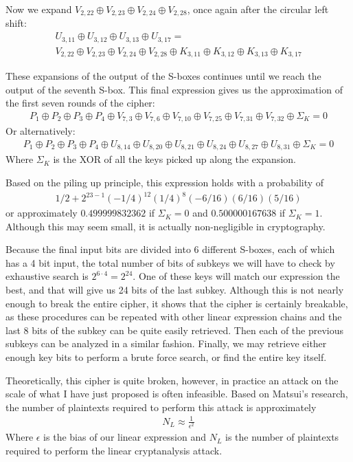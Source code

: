 \documentclass[12pt, a4paper, draft]{report}
\begin{document}
Now we expand $V_{2,22} \oplus V_{2,23} \oplus V_{2,24} \oplus V_{2,28}$, once again
after the circular left shift:
\begin{align*}
    U_{3,11} \oplus U_{3,12} \oplus U_{3,13} \oplus U_{3,17} =\\
    V_{2,22} \oplus V_{2,23} \oplus V_{2,24} \oplus V_{2,28} \oplus K_{3,11}
    \oplus K_{3,12} \oplus K_{3,13} \oplus K_{3,17}
\end{align*}

These expansions of the output of the S-boxes continues until we reach the output of
the seventh S-box. This final expression gives us the approximation of the first seven
rounds of the cipher:
\begin{align*}
    P_1 \oplus P_2 \oplus P_3 \oplus P_4 \oplus V_{7,3} \oplus V_{7,6} \oplus V_{7,10}
    \oplus V_{7,25} \oplus V_{7,31} \oplus V_{7,32} \oplus \Sigma_K= 0
\end{align*}
Or alternatively:
\begin{align*}
    P_1 \oplus P_2 \oplus P_3 \oplus P_4 \oplus U_{8,14} \oplus U_{8,20} \oplus
    U_{8,21} \oplus U_{8,24} \oplus U_{8,27} \oplus U_{8,31} \oplus \Sigma_K = 0
\end{align*}
Where $\Sigma_K$ is the XOR of all the keys picked up along the expansion.

Based on the piling up principle, this expression holds with a probability of
\begin{align*}
1/2 + 2^{23-1}(-1/4)^12(1/4)^8(-6/16)(6/16)(5/16)
\end{align*}
or approximately $0.499999832362$ if $\Sigma_K = 0$ and $0.500000167638$ if
$\Sigma_K = 1$. Although this may seem small, it is actually non-negligible
in cryptography.

Because the final input bits are divided into 6 different S-boxes, each of which has
a 4 bit input, the total number of bits of subkeys we will have to check by exhaustive
search is $2^{6 \cdot 4} = 2^24$. One of these keys will match our expression the best,
and that will give us 24 bits of the last subkey. Although this is not nearly enough
to break the entire cipher, it shows that the cipher is certainly breakable, as these
procedures can be repeated with other linear expression chains and the last 8 bits of the
subkey can be quite easily retrieved. Then each of the previous subkeys can be analyzed
in a similar fashion. Finally, we may retrieve either enough key bits to perform a brute
force search, or find the entire key itself.

Theoretically, this cipher is quite broken, however, in practice an attack on the scale
of what I have just proposed is often infeasible. Based on Matsui's research, the number
of plaintexts required to perform this attack is approximately
\begin{align*}
    N_L \approx \frac{1}{\epsilon^2}
\end{align*}
Where $\epsilon$ is the bias of our linear expression and $N_L$ is the number of
plaintexts required to perform the linear cryptanalysis attack.
\end{document}
